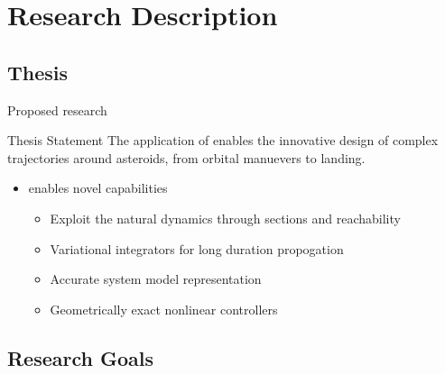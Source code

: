 
\section*{Research Description}
\subsection*{Thesis}

\begin{frame}[t]{Proposed research}
    \begin{block}{Thesis Statement}
        The application of  enables the innovative design of complex trajectories around asteroids, from orbital manuevers to landing.
    \end{block}
    \begin{itemize}
        \item {} enables novel capabilities
        \begin{itemize}     
            \item Exploit the natural dynamics through \Poincare sections and reachability
            \item Variational integrators for long duration propogation
            \item Accurate system model representation
            \item Geometrically exact nonlinear controllers
        \end{itemize}
    \end{itemize}

\end{frame}

\subsection*{Research Goals}

